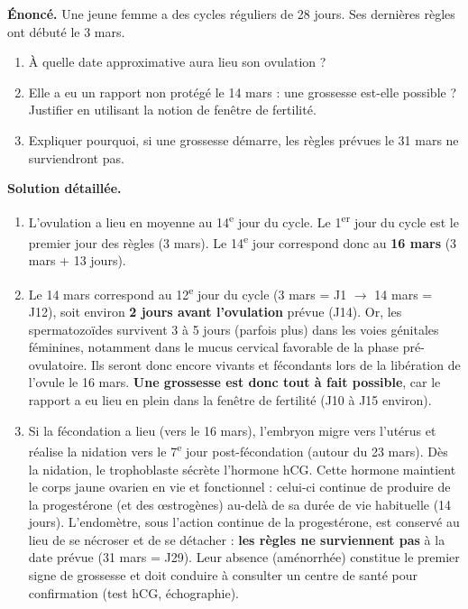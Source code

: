 \documentclass[11pt]{article}
\newcommand{\cle}[1]{{\popxbold\color{popdark}#1}}
\begin{document}
\begin{exoresolu}
\textbf{Énoncé.} Une jeune femme a des cycles réguliers de 28 jours. Ses dernières règles ont débuté le 3 mars. 
\begin{enumerate}
\item À quelle date approximative aura lieu son ovulation ?
\item Elle a eu un rapport non protégé le 14 mars : une grossesse est-elle possible ? Justifier en utilisant la notion de fenêtre de fertilité.
\item Expliquer pourquoi, si une grossesse démarre, les règles prévues le 31 mars ne surviendront pas.
\end{enumerate}

\tcblower
\textbf{Solution détaillée.}
\begin{enumerate}
\item L'ovulation a lieu en moyenne au 14\textsuperscript{e} jour du cycle. Le 1\textsuperscript{er} jour du cycle est le premier jour des règles (3 mars). Le 14\textsuperscript{e} jour correspond donc au \textbf{16 mars} (3 mars + 13 jours).
\item Le 14 mars correspond au 12\textsuperscript{e} jour du cycle (3 mars = J1 $\to$ 14 mars = J12), soit environ \textbf{2 jours avant l'ovulation} prévue (J14). Or, les spermatozoïdes survivent 3 à 5 jours (parfois plus) dans les voies génitales féminines, notamment dans le mucus cervical favorable de la phase pré-ovulatoire. Ils seront donc encore vivants et fécondants lors de la libération de l'ovule le 16 mars. \textbf{Une grossesse est donc tout à fait possible}, car le rapport a eu lieu en plein dans la fenêtre de fertilité (J10 à J15 environ).
\item Si la fécondation a lieu (vers le 16 mars), l'embryon migre vers l'utérus et réalise la nidation vers le 7\textsuperscript{e} jour post-fécondation (autour du 23 mars). Dès la nidation, le trophoblaste sécrète l'hormone \cle{hCG}. Cette hormone maintient le corps jaune ovarien en vie et fonctionnel : celui-ci continue de produire de la progestérone (et des œstrogènes) au-delà de sa durée de vie habituelle (14 jours). L'endomètre, sous l'action continue de la progestérone, est conservé au lieu de se nécroser et de se détacher : \textbf{les règles ne surviennent pas} à la date prévue (31 mars = J29). Leur absence (aménorrhée) constitue le premier signe de grossesse et doit conduire à consulter un centre de santé pour confirmation (test hCG, échographie).
\end{enumerate}
\end{exoresolu}
\end{document}
